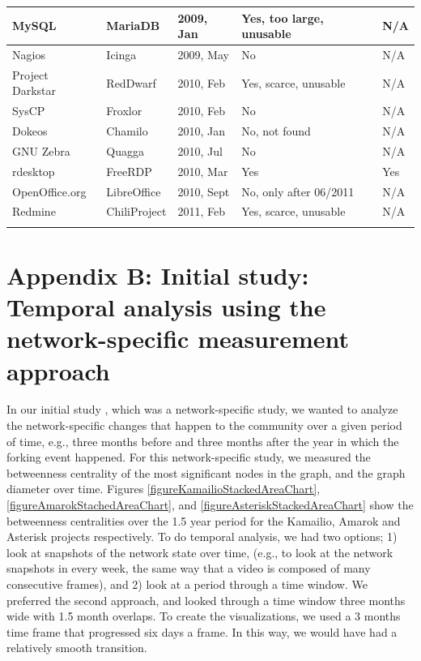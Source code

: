 \documentclass[11pt]{report}
\begin{document}
\begin{appendices}
\begin{table} [H]
\begin{tabular}{m{} m{} m{} m{} m{}}
MySQL & MariaDB & 2009, Jan & Yes, too large, unusable & N/A\\ \hline
Nagios & Icinga & 2009, May & No & N/A \\ \hline
Project Darkstar& RedDwarf & 2010, Feb & Yes, scarce, unusable & N/A \\ \hline
SysCP & Froxlor & 2010, Feb & No & N/A \\ \hline
Dokeos & Chamilo & 2010, Jan & No, not found & N/A \\ \hline
GNU Zebra & Quagga & 2010, Jul & No & N/A \\ \hline
rdesktop & FreeRDP & 2010, Mar & Yes & Yes \\ \hline
OpenOffice.org & LibreOffice & 2010, Sept & No, only after 06/2011 & N/A \\ \hline
Redmine & ChiliProject & 2011, Feb & Yes, scarce, unusable & N/A \\
\noalign{\smallskip}\hline
\end{tabular}
\end{table}

\pagebreak


\section{Appendix B: Initial study: Temporal analysis using the network-specific measurement approach}
\label{sectionInitialStudy}
In our initial study \cite{AzarbakhtOpenSym2013}\cite{AzarbakhtOSS2013}\cite{AzarbakhtVLHCC2014}, which was a network-specific study, we wanted to analyze the network-specific changes that happen to the community over a given period of time, e.g., three months before and three months after the year in which the forking event happened. For this network-specific study, we measured the betweenness centrality \cite{Brandes} of the most significant nodes in the graph, and the graph diameter over time. Figures \ref{figureKamailioStackedAreaChart}, \ref{figureAmarokStachedAreaChart}, and \ref{figureAsteriskStackedAreaChart} show the betweenness centralities over the 1.5 year period for the Kamailio, Amarok and Asterisk projects respectively. To do temporal analysis, we had two options; 1) look at snapshots of the network state over time, (e.g., to look at the network snapshots in every week, the same way that a video is composed of many consecutive frames), and 2) look at a period through a time window. We preferred the second approach, and looked through a time window three months wide with 1.5 month overlaps. To create the visualizations, we used a 3 months time frame that progressed six days a frame. In this way, we would have had a relatively smooth transition.


\end{appendices}
\end{document}
